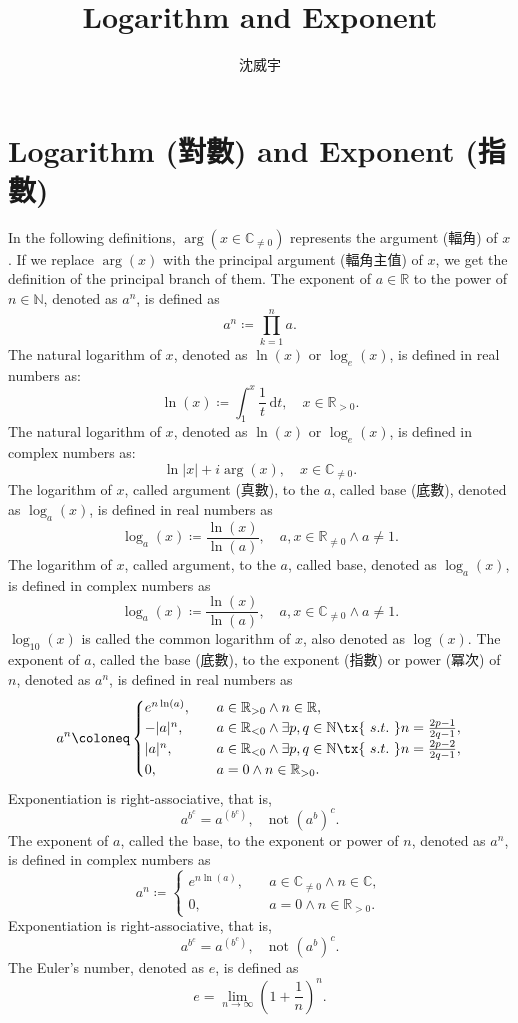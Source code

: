 \documentclass[a4paper,12pt]{article}
\begin{document}
\title{Logarithm and Exponent}
\author{沈威宇}
\date{\temtoday}
\titletocdoc
\section{Logarithm (對數) and Exponent (指數)}
In the following definitions, $\arg(x\in\mathbb{C}_{\neq 0})$ represents the argument (輻角) of $x$. If we replace $\arg(x)$ with the principal argument (輻角主值) of $x$, we get the definition of the principal branch of them.
The exponent of $a\in\mathbb{R}$ to the power of $n\in\mathbb{N}$, denoted as $a^n$, is defined as
\[a^n\coloneq\prod_{k=1}^na.\]
The natural logarithm of $x$, denoted as $\ln(x)$ or $\log_e(x)$, is defined in real numbers as:
\[\ln(x)\coloneq\int_1^x\frac{1}{t}\,\mathrm{d}t,\quad x\in\mathbb{R}_{>0}.\]
The natural logarithm of $x$, denoted as $\ln(x)$ or $\log_e(x)$, is defined in complex numbers as:
\[\ln|x|+i\arg(x),\quad x\in\mathbb{C}_{\neq 0}.\]
The logarithm of $x$, called argument (真數), to the $a$, called base (底數), denoted as $\log_a(x)$, is defined in real numbers as
\[\log_a(x)\coloneq\frac{\ln(x)}{\ln(a)},\quad a,x\in\mathbb{R}_{\neq 0}\land a\neq 1.\]
The logarithm of $x$, called argument, to the $a$, called base, denoted as $\log_a(x)$, is defined in complex numbers as
\[\log_a(x)\coloneq\frac{\ln(x)}{\ln(a)},\quad a,x\in\mathbb{C}_{\neq 0}\land a\neq 1.\]
$\log_{10}(x)$ is called the common logarithm of $x$, also denoted as $\log(x)$.
The exponent of $a$, called the base (底數), to the exponent (指數) or power (冪次) of $n$, denoted as $a^n$, is defined in real numbers as
\[a^n\coloneq\begin{cases}
e^{n\ln(a)},\quad & a\in\mathbb{R}_{>0}\land n\in\mathbb{R},\\
-|a|^n,\quad & a\in\mathbb{R}_{<0}\land \exists p,q\in\mathbb{N}\tx{\ s.t.\ } n=\frac{2p-1}{2q-1},\\
|a|^n,\quad & a\in\mathbb{R}_{<0}\land \exists p,q\in\mathbb{N}\tx{\ s.t.\ } n=\frac{2p-2}{2q-1},\\
0,\quad & a=0\land n\in\mathbb{R}_{>0}.
\end{cases}\]
Exponentiation is right-associative, that is,
\[a^{b^{c}} = a^{(b^{c})}, \quad \text{not\ } (a^b)^c.\]
The exponent of $a$, called the base, to the exponent or power of $n$, denoted as $a^n$, is defined in complex numbers as
\[a^n\coloneq\begin{cases}
e^{n\ln(a)},\quad & a\in\mathbb{C}_{\neq 0}\land n\in\mathbb{C},\\
0,\quad & a=0\land n\in\mathbb{R}_{>0}.
\end{cases}\]
Exponentiation is right-associative, that is,
\[a^{b^{c}} = a^{(b^{c})}, \quad \text{not\ } (a^b)^c.\]
The Euler's number, denoted as $e$, is defined as
\[e=\lim_{n\to\infty}\left(1+\frac{1}{n}\right)^n.\]
\end{document}
